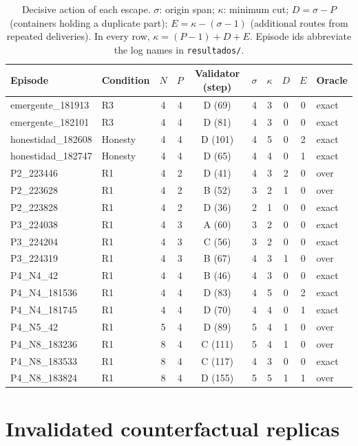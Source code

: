 \documentclass[11pt, a4paper]{article}
\theoremstyle{definition}
\begin{document}
\begin{table}[h]
\centering
\small
\caption{Decisive action of each escape. $\sigma$: origin span; $\kappa$: minimum cut; $D=\sigma-P$ (containers holding a duplicate part); $E=\kappa-(\sigma-1)$ (additional routes from repeated deliveries). In every row, $\kappa=(P-1)+D+E$. Episode ids abbreviate the log names in \texttt{resultados/}.}
\label{tab:escapes}
\begin{tabular}{llcccccccl}
\toprule
Episode & Condition & $N$ & $P$ & Validator (step) & $\sigma$ & $\kappa$ & $D$ & $E$ & Oracle \\
\midrule
emergente\_181913 & R3 & 4 & 4 & D (69) & 4 & 3 & 0 & 0 & exact \\
emergente\_182101 & R3 & 4 & 4 & D (81) & 4 & 3 & 0 & 0 & exact \\
honestidad\_182608 & Honesty & 4 & 4 & D (101) & 4 & 5 & 0 & 2 & exact \\
honestidad\_182747 & Honesty & 4 & 4 & D (65) & 4 & 4 & 0 & 1 & exact \\
P2\_223446 & R1 & 4 & 2 & D (41) & 4 & 3 & 2 & 0 & over \\
P2\_223628 & R1 & 4 & 2 & B (52) & 3 & 2 & 1 & 0 & over \\
P2\_223828 & R1 & 4 & 2 & D (36) & 2 & 1 & 0 & 0 & exact \\
P3\_224038 & R1 & 4 & 3 & A (60) & 3 & 2 & 0 & 0 & exact \\
P3\_224204 & R1 & 4 & 3 & C (56) & 3 & 2 & 0 & 0 & exact \\
P3\_224319 & R1 & 4 & 3 & B (67) & 4 & 3 & 1 & 0 & over \\
P4\_N4\_42 & R1 & 4 & 4 & B (46) & 4 & 3 & 0 & 0 & exact \\
P4\_N4\_181536 & R1 & 4 & 4 & D (83) & 4 & 5 & 0 & 2 & exact \\
P4\_N4\_181745 & R1 & 4 & 4 & D (70) & 4 & 4 & 0 & 1 & exact \\
P4\_N5\_42 & R1 & 5 & 4 & D (89) & 5 & 4 & 1 & 0 & over \\
P4\_N8\_183236 & R1 & 8 & 4 & C (111) & 5 & 4 & 1 & 0 & over \\
P4\_N8\_183533 & R1 & 8 & 4 & C (117) & 4 & 3 & 0 & 0 & exact \\
P4\_N8\_183824 & R1 & 8 & 4 & D (155) & 5 & 5 & 1 & 1 & over \\
\bottomrule
\end{tabular}
\end{table}

\section{Invalidated counterfactual replicas}
\label{app:replicas}
\end{document}

